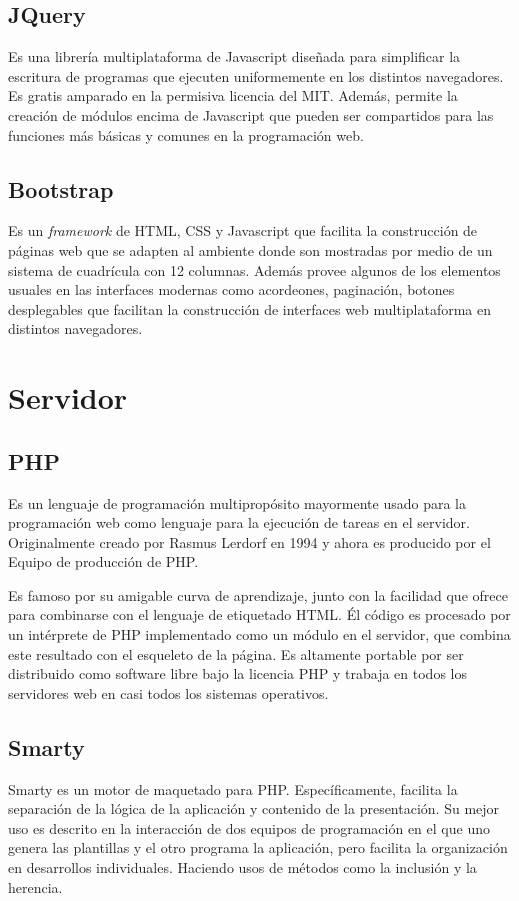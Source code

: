 \subsection{JQuery}
Es una librería multiplataforma de Javascript diseñada para simplificar la escritura de programas que ejecuten uniformemente en los distintos navegadores. Es gratis amparado en la permisiva licencia del MIT. Además, permite la creación de módulos encima de Javascript que pueden ser compartidos para las funciones más básicas y comunes en la programación web.


\subsection{Bootstrap}
Es un \emph{framework} de HTML, CSS y Javascript que facilita la construcción de páginas web que se adapten al ambiente donde son mostradas por medio de un sistema de cuadrícula con 12 columnas. Además provee algunos de los elementos usuales en las interfaces modernas como acordeones, paginación, botones desplegables que facilitan la construcción de interfaces web multiplataforma en distintos navegadores.


\section{Servidor}

\subsection{PHP}

Es un lenguaje de programación multipropósito mayormente usado para la programación web como lenguaje para la ejecución de tareas en el servidor. Originalmente creado por Rasmus Lerdorf en 1994 y ahora es producido por el Equipo de producción de PHP. 

Es famoso por su amigable curva de aprendizaje, junto con la facilidad que ofrece para combinarse con el lenguaje de etiquetado HTML. Él código es procesado por un intérprete de PHP implementado como un módulo en el servidor, que combina este resultado con el esqueleto de la página. Es altamente portable por ser distribuido como software libre bajo la licencia PHP y trabaja en todos los servidores web en casi todos los sistemas operativos.

\subsection{Smarty}
Smarty es un motor de maquetado para PHP. Específicamente, facilita la separación de la lógica de la aplicación y contenido de la presentación. Su mejor uso es descrito en la interacción de dos equipos de programación en el que uno genera las plantillas y el otro programa la aplicación, pero facilita la organización en desarrollos individuales. Haciendo usos de métodos como la inclusión y la herencia.

